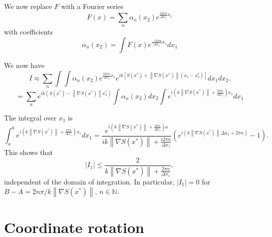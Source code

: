 \documentclass{article}
\newcommand{\norm}[1]{\left\lVert#1\right\rVert}
\theoremstyle{plain}
\begin{document}
We now replace $F$ with a Fourier series
\begin{equation}
	F(x) = \sum_n \alpha_n(x_2) e^{ \frac{i2\pi n}{ \Delta x_1}x_1 }
\end{equation}
with coefficients
\begin{equation}
	\alpha_n(x_2) = \int F(x) e^{ \frac{-i2\pi n}{ \Delta x_1}x_1 } dx_1
\end{equation}


We now have
\begin{equation}
	I \approx \sum_n \int\int \alpha_n(x_2) e^{ \frac{i2\pi n}{ \Delta x_1 }x_1 }
	e^{ik\left[S(x^*) + \norm{\nabla S(x^*)}(x_1-x_1^*) \right]} dx_1dx_2.
\end{equation}
\begin{equation}
	= \sum_n e^{ik \left( S(x^*) - \norm{\nabla S(x^*)}x_1^* \right)} 
	\int \alpha_n(x_2) dx_2 
	\int e^{ i\left( k\norm{\nabla S(x^*)} + \frac{2\pi n}{ \Delta x_1 }\right) x_1 } dx_1
\end{equation}



The integral over $x_1$ is
\begin{equation}
	\int_a^b e^{ i\left( k\norm{\nabla S(x^*)} + \frac{2\pi n}{ \Delta x_1 }\right) x_1 } dx_1
	= \frac{e^{ i\left( k\norm{\nabla S(x^*)} + \frac{2\pi n}{ \Delta x_1 }\right) a } }{ ik\norm{\nabla S(x^*)} + \frac{i2\pi n}{ \Delta x_1 } }
	\left( e^{ i\left( k\norm{\nabla S(x^*)}\Delta x_1 + 2\pi n \right)  } - 1 \right).
\end{equation}
This shows that
\begin{equation}
	|I_1| \leq \frac{2}{k\norm{\nabla S(x^*)} + \frac{2\pi n}{ \Delta x_1 }},
\end{equation}
independent of the domain of integration.
In particular, $|I_1| = 0$ for $B-A = 2n\pi / k\norm{\nabla S(x^*)}$, $n\in\mathbb{N}$.






\section{Coordinate rotation}\label{sec_rotation}
\end{document}

